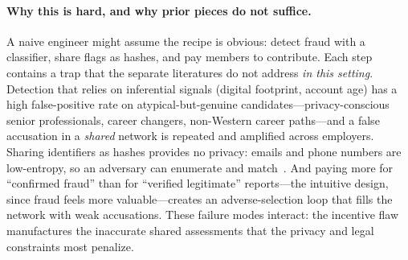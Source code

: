 \documentclass[11pt]{article}
\begin{document}
\paragraph{Why this is hard, and why prior pieces do not suffice.}
A naive engineer might assume the recipe is obvious: detect fraud with a
classifier, share flags as hashes, and pay members to contribute. Each step
contains a trap that the separate literatures do not address \emph{in this
setting}. Detection that relies on inferential signals (digital footprint,
account age) has a high false-positive rate on atypical-but-genuine
candidates---privacy-conscious senior professionals, career changers, non-Western
career paths---and a false accusation in a \emph{shared} network is repeated and
amplified across employers. Sharing identifiers as hashes provides no privacy:
emails and phone numbers are low-entropy, so an adversary can enumerate and
match~\cite{cook2019,skyflow}. And paying more for ``confirmed fraud'' than for
``verified legitimate'' reports---the intuitive design, since fraud feels more
valuable---creates an adverse-selection loop that fills the network with weak
accusations. These failure modes interact: the incentive flaw manufactures the
inaccurate shared assessments that the privacy and legal constraints most
penalize.
\end{document}
